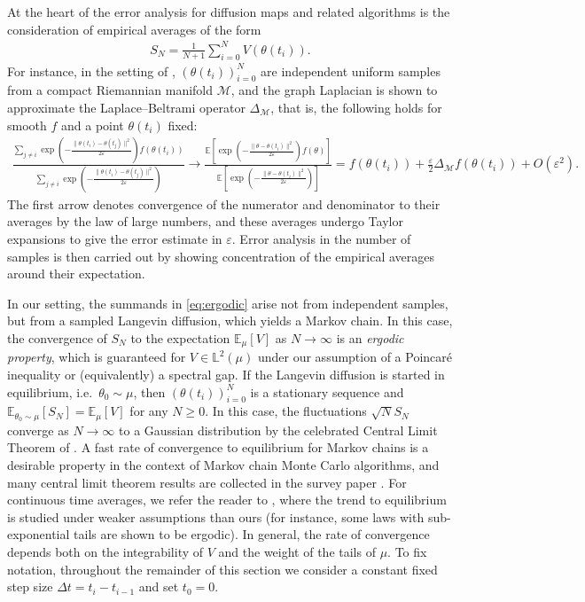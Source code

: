 \documentclass[11pt]{article}
\theoremstyle{plain}
\theoremstyle{definition}
\theoremstyle{remark}
\numberwithin{equation}{section}
\newcommand{\M}{\mathcal{M}}
\newcommand{\lb}{\left}
\newcommand{\rb}{\right}
\newcommand{\veps}{\varepsilon}
\newcommand{\bL}{\mathbb{L}}
\newcommand{\E}{\mathbb{E}}
\begin{document}
At the heart of the error analysis for diffusion maps and related algorithms is the consideration of empirical averages of the form
\begin{align}\label{eq:ergodic}
S_N=\frac{1}{N+1}\sum_{i=0}^{N} V(\theta(t_i)).
\end{align}
For instance, in the setting of \citet{singer_graph_2006}, $(\theta(t_i))_{i=0}^N$ are independent uniform samples from a compact Riemannian manifold $\M$, and the graph Laplacian is shown to approximate the Laplace--Beltrami operator $\Delta_\M$, that is, the following holds for smooth $f$ and a point $\theta(t_i)$ fixed:
\begin{align}\label{eq:quotienttaylor}
\frac{\sum_{j\neq i} \exp\lb(-\frac{\|\theta(t_i)-\theta(t_j)\|^2}{2\veps}\rb)f(\theta(t_i))}{\sum_{j\neq i}\exp\lb(-\frac{\|\theta(t_i)-\theta(t_j)\|^2}{2\veps}\rb)}\to \frac{\E \lb[\exp\lb(-\frac{\|\theta-\theta(t_i)\|^2}{2\veps}\rb)f(\theta)\rb]}{\E \lb[\exp\lb(-\frac{\|\theta-\theta(t_i)\|^2}{2\veps}\rb)\rb]}=f(\theta(t_i))+\frac{\veps}{2}\Delta_\M f(\theta(t_i))+O(\veps^{2}).
\end{align}
The first arrow denotes convergence of the numerator and denominator to their averages by the law of large numbers, and these averages undergo Taylor expansions to give the error estimate in $\veps$. Error analysis in the number of samples is then carried out by showing concentration of the empirical averages around their expectation.

In our setting, the summands in \eqref{eq:ergodic} arise not from independent samples, but from a sampled Langevin diffusion, which yields a Markov chain. In this case, the convergence of $S_N$ to the expectation $\E_{\mu}[V]$ as $N\to\infty$ is an \emph{ergodic property}, which is guaranteed for $V\in\bL^2(\mu)$ under our assumption of a Poincar\'{e} inequality or (equivalently) a spectral gap.
If the Langevin diffusion is started in equilibrium, i.e.~$\theta_0\sim\mu$, then $(\theta(t_i))_{i=0}^N$ is a stationary sequence and $\E_{\theta_0\sim\mu}[S_N]=\E_{\mu}[V]$ for any $N\ge0$. In this case, the fluctuations $\sqrt{N}S_N$ converge as $N\to\infty$ to a Gaussian distribution by the celebrated Central Limit Theorem of \citet{kipnis_central_1986}. 
A fast rate of convergence to equilibrium for Markov chains is a desirable property in the context of Markov chain Monte Carlo algorithms, and many central limit theorem results are collected in the survey paper \citet{roberts_general_2004}. For continuous time averages, we refer the reader to \citet{cattiaux_central_2012}, where the trend to equilibrium is studied under weaker assumptions than ours (for instance, some laws with sub-exponential tails are shown to be ergodic). In general, the rate of convergence depends both on the integrability of $V$ and the weight of the tails of $\mu$. To fix notation, throughout the remainder of this section we consider a constant fixed step size $\Delta t=t_i-t_{i-1}$ and set $t_0=0$.
\end{document}
